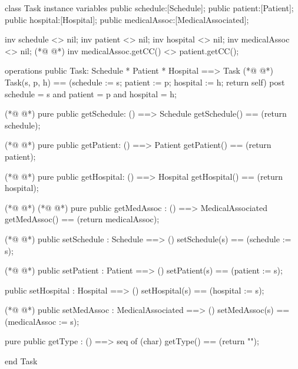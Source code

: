 \begin{vdmpp}[breaklines=true]
class Task
instance variables
  public schedule:[Schedule];
  public patient:[Patient];
  public hospital:[Hospital];
  public medicalAssoc:[MedicalAssociated];
  
  inv schedule <> nil;
  inv patient <> nil;
  inv hospital <> nil;
  inv medicalAssoc <> nil;
(*@
\label{Task:12}
@*)
  inv medicalAssoc.getCC() <> patient.getCC();
  
operations
 public Task: Schedule * Patient * Hospital ==> Task
(*@
\label{getSchedule:16}
@*)
  Task(s, p, h) == (schedule := s; patient := p; hospital := h; return self)
 post schedule = s and patient = p and hospital = h;
 
(*@
\label{getPatient:19}
@*)
 pure public getSchedule: () ==> Schedule
  getSchedule() == (return schedule);
  
(*@
\label{getHospital:22}
@*)
 pure public getPatient: () ==> Patient
  getPatient() == (return patient);
  
(*@
\label{setSchedule:25}
@*)
 pure public getHospital: () ==> Hospital
  getHospital() == (return hospital);
  
(*@
\label{setPatient:28}
@*)
(*@
\label{getMedAssoc:28}
@*)
 pure public getMedAssoc : () ==> MedicalAssociated
  getMedAssoc() == (return medicalAssoc);
  
(*@
\label{setHospital:31}
@*)
 public setSchedule : Schedule ==> ()
  setSchedule(s) == (schedule := s);
  
(*@
\label{getType:34}
@*)
 public setPatient : Patient ==> ()
  setPatient(s) == (patient := s);
  
 public setHospital : Hospital ==> ()
  setHospital(s) == (hospital := s);
 
(*@
\label{setMedAssoc:40}
@*)
 public setMedAssoc : MedicalAssociated ==> ()
  setMedAssoc(s) == (medicalAssoc := s);
  
 pure public getType : () ==> seq of (char) 
  getType() == (return "");

end Task
\end{vdmpp}
